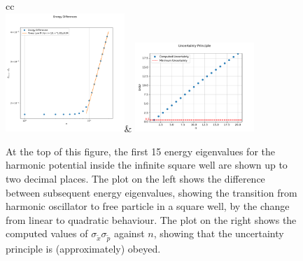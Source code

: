 \documentclass[10pt,a4paper]{article}
\theoremstyle{definition}
\theoremstyle{remark}
\begin{document}
\begin{figure}[h]
    \centering
    \begin{tabular}{cc}
        \\
        \includegraphics[width=0.4\textwidth]{energy_diffs_harmonic_nu.pdf}&
        \includegraphics[width=0.4\textwidth]{uncertainty_principle_for_harmonic_nu.pdf}
    \end{tabular}
    \caption{\label{fig: harmonic_potential_results}At the top of this figure, the first 15 energy eigenvalues for the harmonic potential inside the infinite square well are shown up to two decimal places. The plot on the left shows the difference between subsequent energy eigenvalues, showing the transition from harmonic oscillator to free particle in a square well, by the change from linear to quadratic behaviour. The plot on the right shows the computed values of $\sigma_{\tilde{x}}\sigma_{\tilde{p}}$ against $n$, showing that the uncertainty principle is (approximately) obeyed.}
\end{figure}
\end{document}
